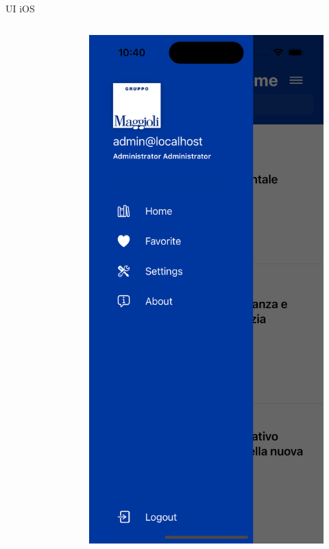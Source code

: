 \begin{frame}{UI iOS}
\begin{columns}[onlytextwidth]
\begin{column}{0.24\textwidth}
\begin{figure}[H]
            \end{figure}
        \end{column}
        \begin{column}{0.24\textwidth}
             \begin{figure}[H]
                \includegraphics[width=1\textwidth]{img/sidenav_ios.png}

\end{figure}
\end{column}
\end{columns}
\end{frame}
